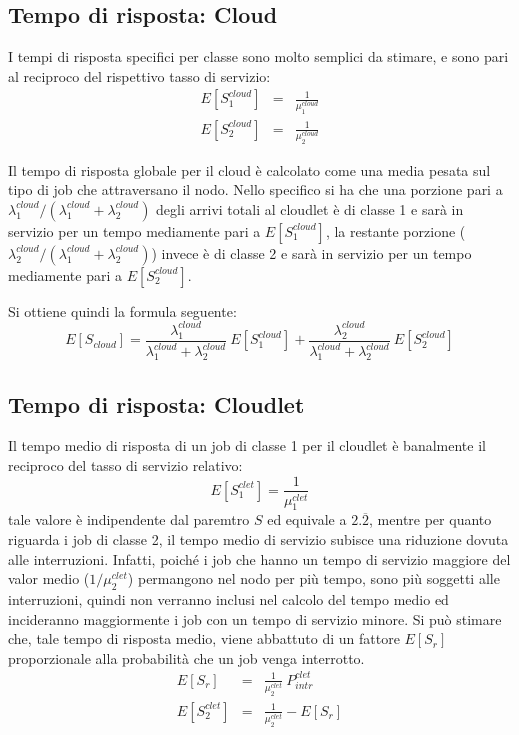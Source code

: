 \subsection{Tempo di risposta: Cloud}
I tempi di risposta specifici per classe sono molto semplici da stimare, e sono
pari al reciproco del rispettivo tasso di servizio:
\begin{eqnarray}
E[S_1^{cloud}] &=& \frac{1}{\mu_1^{cloud}} \\
E[S_2^{cloud}] &=& \frac{1}{\mu_2^{cloud}}
\end{eqnarray}

Il tempo di risposta globale per il cloud è calcolato come una media pesata sul
tipo di job che attraversano il nodo. Nello specifico si ha che una porzione
pari a $\lambda_1^{cloud}/(\lambda_1^{cloud}+\lambda_2^{cloud})$ degli arrivi
totali al cloudlet è di classe 1 e sarà in servizio per un tempo mediamente pari
a $E[S_1^{cloud}]$, la restante porzione
($\lambda_2^{cloud}/(\lambda_1^{cloud}+\lambda_2^{cloud})$) invece è di classe 2
e sarà in servizio per un tempo mediamente pari a $E[S_2^{cloud}]$.

Si ottiene quindi la formula seguente:
\begin{equation}
E[S_{cloud}] = 
\frac{\lambda_1^{cloud}}{\lambda_1^{cloud}+\lambda_2^{cloud}} \ E[S_1^{cloud}] +
\frac{\lambda_2^{cloud}}{\lambda_1^{cloud}+\lambda_2^{cloud}} \ E[S_2^{cloud}] 
\end{equation}
%
\subsection{Tempo di risposta: Cloudlet}
Il tempo medio di risposta di un job di classe 1 per il cloudlet è banalmente il
reciproco del tasso di servizio relativo:
\begin{equation}
E[S_1^{clet}] = \frac{1}{\mu_1^{clet}}
\end{equation}
tale valore è indipendente dal paremtro $S$ ed equivale a $2.\overline2$, mentre
per quanto riguarda i job di classe 2, il tempo medio di servizio subisce una
riduzione dovuta alle interruzioni. Infatti, poiché i job che hanno un tempo
di servizio maggiore del valor medio ($1/\mu_2^{clet}$) permangono nel nodo per
più tempo, sono più soggetti alle interruzioni, quindi
non verranno inclusi nel calcolo del tempo medio ed incideranno maggiormente i
job con un tempo di servizio minore.
Si può stimare che, tale tempo di risposta medio, viene abbattuto di un fattore
$E[S_r]$ proporzionale alla probabilità che un job venga interrotto.
\begin{eqnarray}
E[S_r] &=& \frac{1}{\mu_2^{clet}} \ P_{intr}^{clet}  \nonumber \\
E[S_2^{clet}] &=& \frac{1}{\mu_2^{clet}} - E[S_r]
\end{eqnarray}


